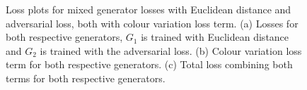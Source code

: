   \begin{figure}[!htbp]
    \centering
    \hfill
    \hfill
    \caption[Loss plots for mixed generator losses with cosine distance and adversarial loss, both with colour variation loss term]{Loss plots for mixed generator losses with Euclidean distance and adversarial loss, both with colour variation loss term. (a) Losses for both respective generators, $G_{1}$ is trained with Euclidean distance and $G_{2}$ is trained with the adversarial loss. (b) Colour variation loss term for both respective generators. (c) Total loss combining both terms for both respective generators. }
    \label{fig:c3:euclid-adv-losses}
  \end{figure}

  \FloatBarrier

